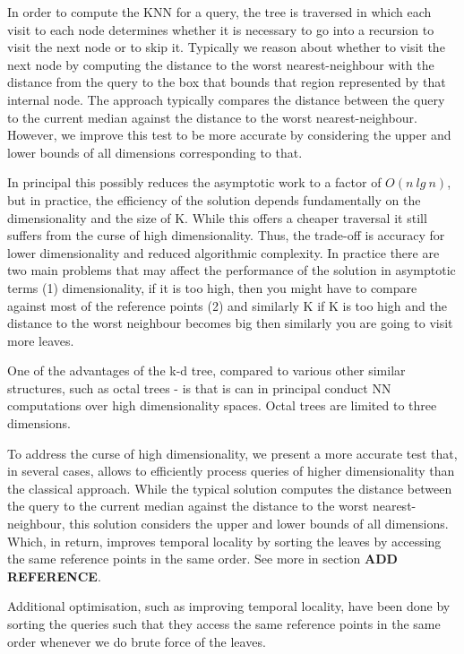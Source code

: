 In order to compute the KNN for a query, the tree is traversed in which each visit to each node determines whether it is necessary to go into a recursion to visit the next node or to skip it. Typically we reason about whether to visit the next node by computing the distance to the worst nearest-neighbour with the distance from the query to the box that bounds that region represented by that internal node. The approach typically compares the distance between the query to the current median against the distance to the worst nearest-neighbour. However, we improve this test to be more accurate by considering the upper and lower bounds of all dimensions corresponding to that.  



In principal this possibly reduces the asymptotic work to a factor of $O(n\ lg\ n)$, but in practice, the efficiency of the solution depends fundamentally on the dimensionality and the size of K. While this offers a cheaper traversal it still suffers from the curse of high dimensionality. Thus, the trade-off is accuracy for lower dimensionality and reduced algorithmic complexity. In practice there are two main problems that may affect the performance of the solution in asymptotic terms (1) dimensionality, if it is too high, then you might have to compare against most of the reference points (2) and similarly K if K is too high and the distance to the worst neighbour becomes big then similarly you are going to visit more leaves. 

One of the advantages of the k-d tree, compared to various other similar structures, such as octal trees - is that is can in principal conduct NN computations over high dimensionality spaces. Octal trees are limited to three dimensions. 

To address the curse of high dimensionality, we present a more accurate test that, in several cases, allows to efficiently process queries of higher dimensionality than the classical approach. While the typical solution computes the distance between the query to the current median against the distance to the worst nearest-neighbour, this solution considers the upper and lower bounds of all dimensions. Which, in return, improves temporal locality by sorting the leaves by accessing the same reference points in the same order. See more in section \textbf{ADD REFERENCE}.

Additional optimisation, such as improving temporal locality, have been done by sorting the queries such that they access the same reference points in the same order whenever we do brute force of the leaves.



